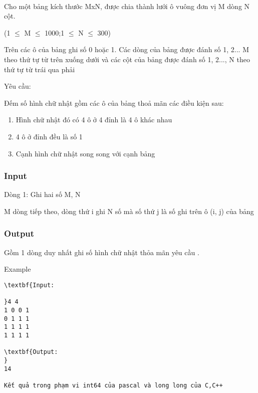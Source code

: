 

 

Cho một bảng kích thước MxN, được chia thành lưới ô vuông đơn vị M dòng N cột.


(1 $\le$ M $\le$ 1000;1 $\le$ N $\le$ 300)





Trên các ô của bảng ghi số 0 hoặc 1. Các dòng của bảng được đánh số 1, 2... M theo thứ tự từ trên xuống dưới và các cột của bảng được đánh số 1, 2..., N theo thứ tự từ trái qua phải





Yêu cầu:





Đếm số hình chữ nhật gồm các ô của bảng thoả mãn các điều kiện sau:
\begin{enumerate}
	\item Hình chữ nhật đó có 4 ô ở 4 đỉnh là 4 ô khác nhau
	\item 4 ô ở đỉnh đều là số 1
	\item Cạnh hình chữ nhật song song với cạnh bảng
\end{enumerate}

\subsubsection{Input}

Dòng 1: Ghi hai số M, N





M dòng tiếp theo, dòng thứ i ghi N số mà số thứ j là số ghi trên ô (i, j) của bảng

\subsubsection{Output}

Gồm 1 dòng duy nhất ghi số hình chữ nhật thỏa mãn yêu cầu .





Example
\begin{verbatim}
\textbf{Input:

}4 4
1 0 0 1
0 1 1 1
1 1 1 1
1 1 1 1

\textbf{Output:
}
14

Kết quả trong phạm vi int64 của pascal và long long của C,C++


\end{verbatim}
